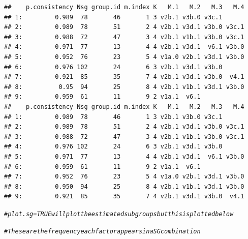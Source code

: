 \documentclass[9pt]{article}\usepackage[]{graphicx}\usepackage[]{xcolor}
\makeatletter
\newcommand{\hlcom}[1]{\textcolor[rgb]{0.678,0.584,0.686}{\textit{#1}}}%
\newenvironment{kframe}{%
 \def\at@end@of@kframe{}%
 \ifinner\ifhmode%
  \def\at@end@of@kframe{\end{minipage}}%
  \begin{minipage}{\columnwidth}%
 \fi\fi%
 \def\FrameCommand##1{\hskip\@totalleftmargin \hskip-\fboxsep
 \colorbox{shadecolor}{##1}\hskip-\fboxsep
     \hskip-\linewidth \hskip-\@totalleftmargin \hskip\columnwidth}%
 \MakeFramed {\advance\hsize-\width
   \@totalleftmargin\z@ \linewidth\hsize
   \@setminipage}}%
 {\par\unskip\endMakeFramed%
 \at@end@of@kframe}
\newenvironment{knitrout}{}{} %
\theoremstyle{definition}
\theoremstyle{remark}
\makeatother
\begin{document}
\begin{knitrout}
\begin{kframe}
\begin{verbatim}
##    p.consistency Nsg group.id m.index K   M.1   M.2   M.3   M.4
## 1:         0.989  78       46       1 3 v2b.1 v3b.0 v3c.1      
## 2:         0.989  78       51       2 4 v2b.1 v3d.1 v3b.0 v3c.1
## 3:         0.988  72       47       3 4 v2b.1 v1b.1 v3b.0 v3c.1
## 4:         0.971  77       13       4 4 v2b.1 v3d.1  v6.1 v3b.0
## 5:         0.952  76       23       5 4 v1a.0 v2b.1 v3d.1 v3b.0
## 6:         0.976 102       24       6 3 v2b.1 v3d.1 v3b.0      
## 7:         0.921  85       35       7 4 v2b.1 v3d.1 v3b.0  v4.1
## 8:          0.95  94       25       8 4 v2b.1 v1b.1 v3d.1 v3b.0
## 9:         0.959  61       11       9 2 v1a.1  v6.1            
##    p.consistency Nsg group.id m.index K   M.1   M.2   M.3   M.4
## 1:         0.989  78       46       1 3 v2b.1 v3b.0 v3c.1      
## 2:         0.989  78       51       2 4 v2b.1 v3d.1 v3b.0 v3c.1
## 3:         0.988  72       47       3 4 v2b.1 v1b.1 v3b.0 v3c.1
## 4:         0.976 102       24       6 3 v2b.1 v3d.1 v3b.0      
## 5:         0.971  77       13       4 4 v2b.1 v3d.1  v6.1 v3b.0
## 6:         0.959  61       11       9 2 v1a.1  v6.1            
## 7:         0.952  76       23       5 4 v1a.0 v2b.1 v3d.1 v3b.0
## 8:         0.950  94       25       8 4 v2b.1 v1b.1 v3d.1 v3b.0
## 9:         0.921  85       35       7 4 v2b.1 v3d.1 v3b.0  v4.1
\end{verbatim}
\begin{alltt}
\hlcom{# plot.sg=TRUE will plot the estimated subgroups but this is plotted below}

\hlcom{# These are the frequency each factor appears in a SG combination}


\end{alltt}
\end{kframe}
\end{knitrout}
\end{document}
